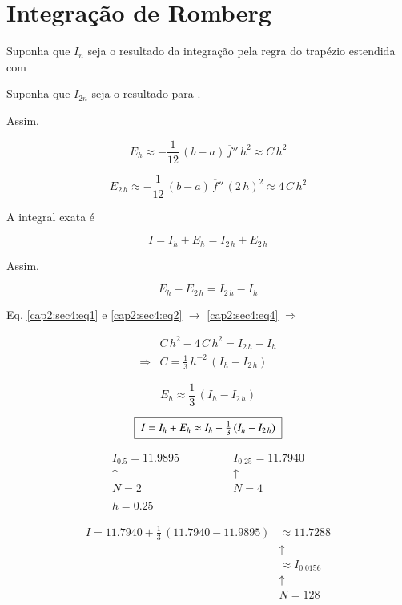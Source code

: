 \section{Integração de Romberg}

Suponha que $I_{n}$ seja o resultado da integração pela regra do trapézio estendida com 

Suponha que $I_{2n}$ seja o resultado para .

Assim,

\begin{equation}
 \label{cap2:sec4:eq1}
 E_h \approx - \frac{1}{12} \, (b-a) \, \overline{f}'' \, h^2 \approx C\,h^2
\end{equation}

\begin{equation}
 \label{cap2:sec4:eq2}
 E_{2\,h} \approx - \frac{1}{12} \, (b-a) \, \overline{f}'' \, (2\,h)^2 \approx 4\,C\,h^2
\end{equation}

A integral exata é

\begin{equation}
 \label{cap2:sec4:eq3}
I = I_h + E_h = I_{2\,h} + E_{2\,h}
\end{equation}

Assim,

\begin{equation}
 \label{cap2:sec4:eq4}
 E_h - E_{2\,h} = I_{2\,h} - I_h
\end{equation}

Eq. \ref{cap2:sec4:eq1} e \ref{cap2:sec4:eq2} $ \rightarrow $ \ref{cap2:sec4:eq4} $ \Rightarrow $

\[
 \begin{array}{ll}
              & C\,h^2 - 4\,C\,h^2 = I_{2\,h} - I_h \\
  \Rightarrow & C = \displaystyle \frac{1}{3} \, h^{-2} \, (I_h - I_{2\,h})
 \end{array}
\]

\[
 E_h \approx \frac{1}{3} \, (I_h - I_{2\,h})
\]

\[
 \quadricular{ I = I_h + E_h \approx I_h + \frac{1}{3} \, (I_h - I_{2\,h}) }
\]

\begin{example}

\[
 \begin{array}{ll}
  I_{0.5} = 11.9895 \qquad \qquad & I_{0.25} = 11.7940 \\
  \uparrow & \uparrow \\
  N = 2 & N = 4 \\
  \\
  h = 0.25
 \end{array}
\]

\[
 \begin{array}{lc}
  I = 11.7940 + \displaystyle \frac{1}{3} \, (11.7940 - 11.9895) & \approx 11.7288 \\
  & \uparrow \\
  & \approx I_{0.0156} \\
  & \uparrow \\
  & N = 128
 \end{array}
\]

\end{example}